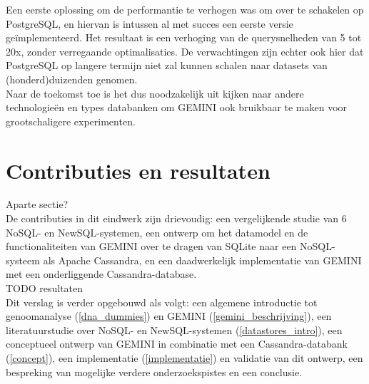 Een eerste oplossing om de performantie te verhogen was om over te schakelen op PostgreSQL, en hiervan is intussen al met succes een eerste versie ge\"implementeerd. Het resultaat is een verhoging van de querysnelheden van 5 tot 20x, zonder verregaande optimalisaties. De verwachtingen zijn echter ook hier dat PostgreSQL op langere termijn niet zal kunnen schalen naar datasets van (honderd)duizenden genomen.\\
Naar de toekomst toe is het dus noodzakelijk uit kijken naar andere technologie\"en en types databanken om GEMINI ook bruikbaar te maken voor grootschaligere experimenten.

\section{Contributies en resultaten}

{\color{red} Aparte sectie?}\\
De contributies in dit eindwerk zijn drievoudig: een vergelijkende studie van 6 NoSQL- en NewSQL-systemen, een ontwerp om het datamodel en de functionaliteiten van GEMINI over te dragen van SQLite naar een NoSQL-systeem als Apache Cassandra, en een daadwerkelijk implementatie van GEMINI met een onderliggende Cassandra-database.\\

{\color{red} TODO resultaten}\\

Dit verslag is verder opgebouwd als volgt: een algemene introductie tot genoomanalyse (\ref{dna_dummies}) en GEMINI (\ref{gemini_beschrijving}), een literatuurstudie over NoSQL- en NewSQL-systemen (\ref{datastores_intro}), een conceptueel ontwerp van GEMINI in combinatie met een Cassandra-databank (\ref{concept}), een implementatie (\ref{implementatie}) en validatie van dit ontwerp, een bespreking van mogelijke verdere onderzoekspistes en een conclusie.


